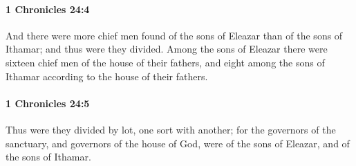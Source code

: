 		\paragraph{1 Chronicles 24:4} %
			\label{1CHRONICLES-24-4}

			And there were more chief men found of the sons of Eleazar than of the sons of Ithamar; and thus were they divided. Among the sons of Eleazar there were sixteen chief men of the house of their fathers, and eight among the sons of Ithamar according to the house of their fathers.


		\paragraph{1 Chronicles 24:5} %
			\label{1CHRONICLES-24-5}

			Thus were they divided by lot, one sort with another; for the governors of the sanctuary, and governors of the house of God, were of the sons of Eleazar, and of the sons of Ithamar.


